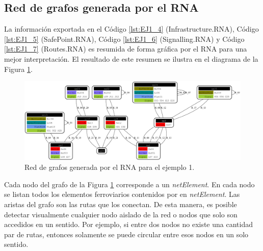 \subsection{Red de grafos generada por el RNA}
	
 	La información exportada en el Código \ref{lst:EJ1_4} (Infrastructure.RNA), Código \ref{lst:EJ1_5} (SafePoint.RNA), Código \ref{lst:EJ1_6} (Signalling.RNA) y Código \ref{lst:EJ1_7} (Routes.RNA) es resumida de forma gráfica por el RNA para una mejor interpretación. El resultado de este resumen se ilustra en el diagrama de la Figura \ref{fig:EJ1_8}.

	\begin{figure}[H]
		\centering
		\includegraphics[origin = c, width=\textwidth]{Figuras/Graph_1}
		\centering\caption{Red de grafos generada por el RNA para el ejemplo 1.}
		\label{fig:EJ1_8}
	\end{figure}
	
	Cada nodo del grafo de la Figura \ref{fig:EJ1_8} corresponde a un \textit{netElement}. En cada nodo se listan todos los elementos ferroviarios contenidos por en \textit{netElement}. Las aristas del grafo son las rutas que los conectan. De esta manera, es posible detectar visualmente cualquier nodo aislado de la red o nodos que solo son accedidos en un sentido. Por ejemplo, si entre dos nodos no existe una cantidad par de rutas, entonces solamente se puede circular entre esos nodos en un solo sentido.